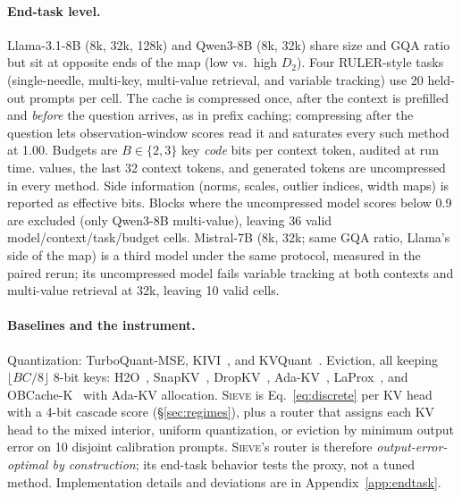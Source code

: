 \documentclass{article}
\newcommand{\sieve}{\textsc{Sieve}}
\theoremstyle{definition}
\begin{document}
\paragraph{End-task level.}
Llama-3.1-8B (8k, 32k, 128k) and Qwen3-8B (8k, 32k) share size and GQA ratio but sit at opposite ends of the map (low vs.\ high $D_2$).  Four RULER-style tasks~\citep{hsieh2024ruler} (single-needle, multi-key, multi-value retrieval, and variable tracking) use 20 held-out prompts per cell.  The cache is compressed once, after the context is prefilled and \emph{before} the question arrives, as in prefix caching; compressing after the question lets observation-window scores read it and saturates every such method at 1.00.  Budgets are $B\in\{2,3\}$ key \emph{code} bits per context token, audited at run time. 
 values, the last 32 context tokens, and generated tokens are uncompressed in every method.  Side information (norms, scales, outlier indices, width maps) is reported as effective bits.  Blocks where the uncompressed model scores below 0.9 are excluded (only Qwen3-8B multi-value), leaving 36 valid model/context/task/budget cells.  Mistral-7B (8k, 32k; same GQA ratio, Llama's side of the map) is a third model under the same protocol, measured in the paired rerun; its uncompressed model fails variable tracking at both contexts and multi-value retrieval at 32k, leaving 10 valid cells.

\paragraph{Baselines and the instrument.}
Quantization: TurboQuant-MSE, KIVI~\citep{liu2024kivi}, and KVQuant~\citep{hooper2024kvquant}.  Eviction, all keeping $\lfloor BC/8\rfloor$ 8-bit keys: H2O~\citep{zhang2023h2o}, SnapKV~\citep{li2024snapkv}, DropKV~\citep{zhang2026dropkv}, Ada-KV~\citep{feng2024adakv}, LaProx~\citep{mai2026laprox}, and OBCache-K~\citep{gu2026obcache} with Ada-KV allocation.  \sieve{} is Eq.~\ref{eq:discrete} per KV head with a 4-bit cascade score (\S\ref{sec:regimes}), plus a router that assigns each KV head to the mixed interior, uniform quantization, or eviction by minimum output error on 10 disjoint calibration prompts.  \sieve{}'s router is therefore \emph{output-error-optimal by construction}; its end-task behavior tests the proxy, not a tuned method.  Implementation details and deviations are in Appendix~\ref{app:endtask}.

\end{document}
